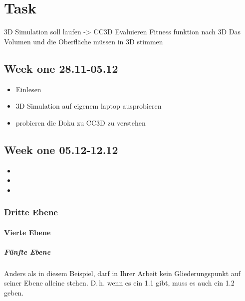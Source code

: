 \chapter{Task}
3D Simulation soll laufen -> CC3D Evaluieren\newline
Fitness funktion nach 3D
Das Volumen und die Oberfläche müssen in 3D stimmen
\section{Week one 28.11-05.12}
\begin{itemize}
\item Einlesen
\item 3D Simulation auf eigenem laptop ausprobieren
\item probieren die Doku zu CC3D zu verstehen
\end{itemize}

\section{Week one 05.12-12.12}
\begin{itemize}
\item 
\item 
\item 
\end{itemize}
\subsection{Dritte Ebene}

\label{Gliederung:EbeneDrei}


\subsubsection{Vierte Ebene}

\paragraph{Fünfte Ebene} Anders als in diesem Beispiel, darf in Ihrer Arbeit kein Gliederungspunkt auf seiner Ebene alleine stehen. D.\,h. wenn es ein 1.1 gibt, muss es auch ein 1.2 geben.
